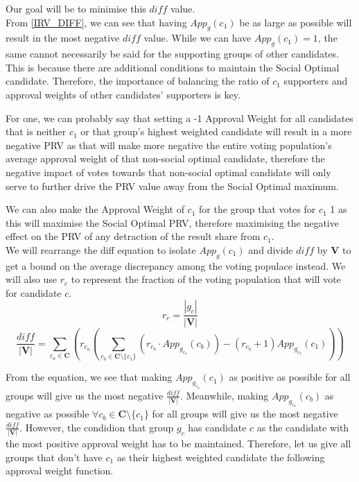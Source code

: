 \documentclass{article}
\begin{document}
Our goal will be to minimise this $diff$ value.\\

From \eqref{IRV_DIFF}, we can see that having ${App}_{g}(c_1)$ be as large as possible will result in the most negative $diff$ value. While we can have ${App}_{g}(c_1) = 1$, the same cannot necessarily be said for the supporting groups of other candidates. This is because there are additional conditions to maintain the Social Optimal candidate. Therefore, the importance of balancing the ratio of $c_1$ supporters and approval weights of other candidates' supporters is key. 

For one, we can probably say that setting a -1 Approval Weight for all candidates that is neither $c_1$ or that group's highest weighted candidate will result in a more negative PRV as that will make more negative the entire voting population's average approval weight of that non-social optimal candidate, therefore the negative impact of votes towards that non-social optimal candidate will only serve to further drive the PRV value away from the Social Optimal maximum.

We can also make the Approval Weight of $c_1$ for the group that votes for $c_1$ 1 as this will maximise the Social Optimal PRV, therefore maximising the negative effect on the PRV of any detraction of the result share from $c_1$.\\

We will rearrange the diff equation to isolate ${App}_g(c_1)$ and divide $diff$ by $\boldsymbol{V}$ to get a bound on the average discrepancy among the voting populace instead. We will also use $r_c$ to represent the fraction of the voting population that will vote for candidate $c$.
\begin{equation}
    r_c = \frac{|g_c|}{|\boldsymbol{V}|}
\end{equation}
\begin{equation}
\frac{diff}{|\boldsymbol{V}|} = \sum^{}_{c_a \in \boldsymbol{C}}{\left(r_{c_a} \left( \sum^{}_{c_b \in \boldsymbol{C} \setminus \{c_1\}}{\left(r_{c_b} \cdot App_{g_{c_a}}(c_b)\right)} - \left(r_{c_b} + 1\right)App_{g_{c_a}}(c_1) \right) \right)}
\end{equation}

From the equation, we see that making $App_{g_{c_a}}(c_1)$ as positive as possible for all groups will give us the most negative $\frac{diff}{|\boldsymbol{V}|}$. Meanwhile, making $App_{g_{c_a}}(c_b)$ as negative as possible $\forall c_b \in \boldsymbol{C} \setminus \{c_1\}$ for all groups will give us the most negative $\frac{diff}{|\boldsymbol{V}|}$.
However, the condidion that group $g_c$ has candidate $c$ as the candidate with the most positive approval weight has to be maintained. Therefore, let us give all groups that don't have $c_1$ as their highest weighted candidate the following approval weight function.\\
\end{document}
